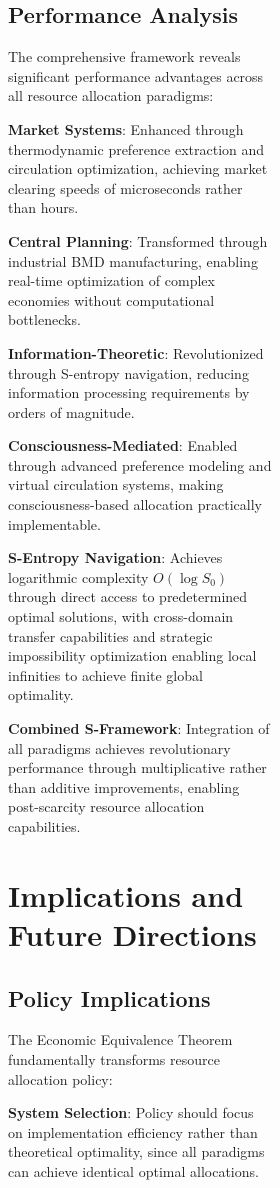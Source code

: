 \documentclass[12pt,a4paper]{article}
\begin{document}
\begin{figure}[H]
\begin{figure}[H]
\begin{figure}[H]
\subsection{Performance Analysis}

The comprehensive framework reveals significant performance advantages across all resource allocation paradigms:

\textbf{Market Systems}: Enhanced through thermodynamic preference extraction and circulation optimization, achieving market clearing speeds of microseconds rather than hours.

\textbf{Central Planning}: Transformed through industrial BMD manufacturing, enabling real-time optimization of complex economies without computational bottlenecks.

\textbf{Information-Theoretic}: Revolutionized through S-entropy navigation, reducing information processing requirements by orders of magnitude.

\textbf{Consciousness-Mediated}: Enabled through advanced preference modeling and virtual circulation systems, making consciousness-based allocation practically implementable.

\textbf{S-Entropy Navigation}: Achieves logarithmic complexity $O(\log S_0)$ through direct access to predetermined optimal solutions, with cross-domain transfer capabilities and strategic impossibility optimization enabling local infinities to achieve finite global optimality.

\textbf{Combined S-Framework}: Integration of all paradigms achieves revolutionary performance through multiplicative rather than additive improvements, enabling post-scarcity resource allocation capabilities.

\section{Implications and Future Directions}

\subsection{Policy Implications}

The Economic Equivalence Theorem fundamentally transforms resource allocation policy:

\textbf{System Selection}: Policy should focus on implementation efficiency rather than theoretical optimality, since all paradigms can achieve identical optimal allocations.


\end{figure}
\end{figure}
\end{figure}
\end{document}
